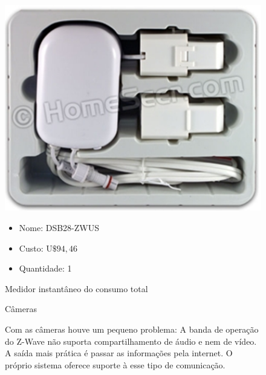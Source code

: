 \begin{enumerate}
\begin{figure}[h]
	  \begin{center}
		\includegraphics[keepaspectratio,scale=0.60]{figuras/medidor_instantaneo.eps}
		\caption{Medidor instantâneo do consumo total}
	  \end{center}

	\begin{itemize}
		\item Nome: DSB28-ZWUS
		\item Custo: U$\$ 94,46$
		\item Quantidade: 1
	\end{itemize}
	\end{figure}
	
	\begin{figure}[h]
	\item Câmeras
	
	Com as câmeras houve um pequeno problema: A banda de operação do Z-Wave não suporta compartilhamento de áudio e nem de vídeo. A saída mais prática é passar as informações pela internet. O próprio sistema oferece suporte à esse tipo de comunicação.
	

\end{figure}
\end{enumerate}
